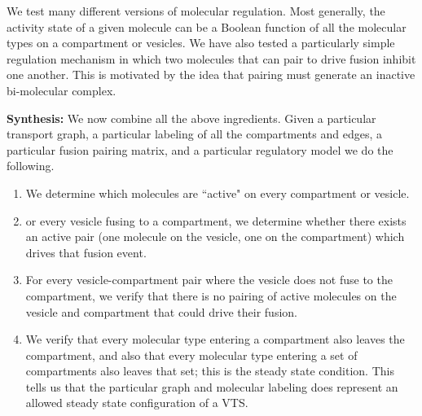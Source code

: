 We test many different versions of molecular
regulation.
%
Most generally, the activity state of a given molecule can be a
Boolean function of all the molecular types on a compartment or vesicles.
We have also tested a particularly simple regulation mechanism in which two
molecules that can pair to drive fusion inhibit one another.
%
This is motivated by the idea that pairing must generate an inactive
bi-molecular complex.

\textbf{Synthesis:} We now combine all the above ingredients.
%
Given a particular
transport graph, a particular labeling of all the compartments and edges,
a particular fusion pairing matrix, and a particular regulatory model we do
the following.
\begin{enumerate}
\item We determine which molecules are ``active" on every
compartment or vesicle.
\item or every vesicle fusing to a compartment, we
determine whether there exists an active pair (one molecule on the vesicle,
one on the compartment) which drives that fusion event.
\item For every vesicle-compartment pair where the vesicle does not fuse to the
compartment, we verify that there is no pairing of active molecules on the
vesicle and compartment that could drive their fusion.
\item We verify that every molecular type entering a compartment also leaves the compartment,
and also that every molecular type entering a set of compartments also
leaves that set; this is the steady state condition.
%
This tells us that the
particular graph and molecular labeling does represent an allowed steady
state configuration of a VTS.
\end{enumerate}


